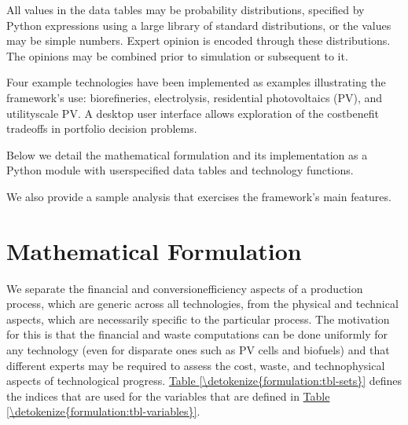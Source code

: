 \documentclass[letterpaper,10pt,english]{sphinxmanual}
\begin{document}
\sphinxAtStartPar
All values in the data tables may be probability distributions,
specified by Python expressions using a large library of standard
distributions, or the values may be simple numbers. Expert opinion is
encoded through these distributions. The opinions may be combined prior
to simulation or subsequent to it.

\sphinxAtStartPar
Four example technologies have been implemented as examples illustrating the
framework’s use: biorefineries, electrolysis, residential photovoltaics
(PV), and utility\sphinxhyphen{}scale PV. A desktop user interface allows exploration
of the cost\sphinxhyphen{}benefit trade\sphinxhyphen{}offs in portfolio decision problems.

\sphinxAtStartPar
Below we detail the mathematical formulation and its implementation as a
Python module with user\sphinxhyphen{}specified data tables and technology functions.

\sphinxAtStartPar
We also provide a sample analysis that exercises the framework’s main
features.

\sphinxstepscope


\chapter{Mathematical Formulation}
\label{\detokenize{formulation:mathematical-formulation}}\label{\detokenize{formulation:sec-formulation}}\label{\detokenize{formulation::doc}}
\sphinxAtStartPar
We separate the financial and conversion\sphinxhyphen{}efficiency aspects of a
production process, which are generic across all technologies, from the
physical and technical aspects, which are necessarily specific to the
particular process. The motivation for this is that the financial and
waste computations can be done uniformly for any technology (even for
disparate ones such as PV cells and biofuels) and that different experts
may be required to assess the cost, waste, and techno\sphinxhyphen{}physical aspects
of technological progress. \hyperref[\detokenize{formulation:tbl-sets}]{Table \ref{\detokenize{formulation:tbl-sets}}} defines the indices that are used
for the variables that are defined in \hyperref[\detokenize{formulation:tbl-variables}]{Table \ref{\detokenize{formulation:tbl-variables}}}.
\end{document}
